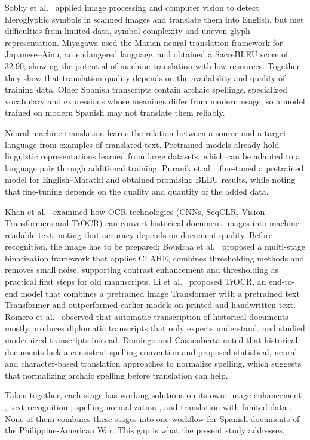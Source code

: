 \documentclass[10pt,twocolumn]{article}
\begin{document}
Sobhy et al.\ \cite{sobhy} applied image processing and computer vision to detect hieroglyphic symbols in scanned images and translate them into English, but met difficulties from limited data, symbol complexity and uneven glyph representation. Miyagawa \cite{miyagawa} used the Marian neural translation framework for Japanese--Ainu, an endangered language, and obtained a SacreBLEU score of 32.90, showing the potential of machine translation with low resources. Together they show that translation quality depends on the availability and quality of training data. Older Spanish transcripts contain archaic spellings, specialized vocabulary and expressions whose meanings differ from modern usage, so a model trained on modern Spanish may not translate them reliably.

Neural machine translation learns the relation between a source and a target language from examples of translated text. Pretrained models already hold linguistic representations learned from large datasets, which can be adapted to a language pair through additional training. Puranik et al.\ \cite{puranik} fine-tuned a pretrained model for English--Marathi and obtained promising BLEU results, while noting that fine-tuning depends on the quality and quantity of the added data.

Khan et al.\ \cite{khan} examined how OCR technologies (CNNs, SeqCLR, Vision Transformers and TrOCR) can convert historical document images into machine-readable text, noting that accuracy depends on document quality. Before recognition, the image has to be prepared: Boudraa et al.\ \cite{boudraa} proposed a multi-stage binarization framework that applies CLAHE, combines thresholding methods and removes small noise, supporting contrast enhancement and thresholding as practical first steps for old manuscripts. Li et al.\ \cite{li} proposed TrOCR, an end-to-end model that combines a pretrained image Transformer with a pretrained text Transformer and outperformed earlier models on printed and handwritten text. Romero et al.\ \cite{romero} observed that automatic transcription of historical documents mostly produces diplomatic transcripts that only experts understand, and studied modernized transcripts instead. Domingo and Casacuberta \cite{domingo} noted that historical documents lack a consistent spelling convention and proposed statistical, neural and character-based translation approaches to normalize spelling, which suggests that normalizing archaic spelling before translation can help.

Taken together, each stage has working solutions on its own: image enhancement \cite{boudraa}, text recognition \cite{khan,romero,li}, spelling normalization \cite{domingo}, and translation with limited data \cite{sobhy,miyagawa}. None of them combines these stages into one workflow for Spanish documents of the Philippine-American War. This gap is what the present study addresses.
\end{document}

